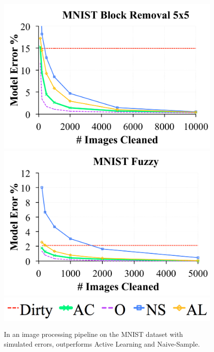 

\begin{figure}[t]
\centering
 \includegraphics[width=0.49\columnwidth]{exp/exp7a.pdf}
 \includegraphics[width=0.49\columnwidth]{exp/exp7b.pdf}
 \includegraphics[width=0.49\columnwidth]{exp/legend-general.png}\vspace{-0.5em}
 \caption{In an image processing pipeline on the MNIST dataset with simulated errors, \sys outperforms Active Learning and Naive-Sample.  \label{mnist}}\vspace{-1em}
\end{figure}


